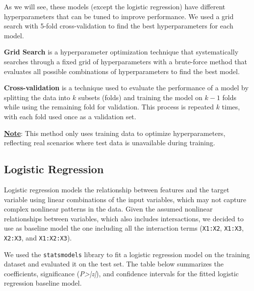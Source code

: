 As we will see, these models (except the logistic regression) have different hyperparameters that can be tuned to improve performance. We used a grid search with 5-fold cross-validation to find the best hyperparameters for each model.

\vspace{-0.2em}

\begin{tcolorbox}[colback=gray!10,colframe=gray!70,title= What are Grid Search and Cross Validation?]
	\textbf{Grid Search} is a hyperparameter optimization technique that systematically searches through a fixed grid of hyperparameters with a brute-force method that evaluates all possible combinations of hyperparameters to find the best model.

	\vspace{0.3em}

	\textbf{Cross-validation} is a technique used to evaluate the performance of a model by splitting the data into $k$ subsets (folds) and training the model on $k-1$ folds while using the remaining fold for validation. This process is repeated $k$ times, with each fold used once as a validation set.
	
	\vspace{0.3em}

	\underline{\textbf{Note}}: This method only uses training data to optimize hyperparameters, reflecting real scenarios where test data is unavailable during training.
\end{tcolorbox}

\subsection{Logistic Regression}

Logistic regression models the relationship between features and the target variable using linear combinations of the input variables, which may not capture complex nonlinear patterns in the data. Given the assumed nonlinear relationships between variables, which also includes intersactions, we decided to use as baseline model the one including all the interaction terms (\texttt{X1:X2}, \texttt{X1:X3}, \texttt{X2:X3}, and \texttt{X1:X2:X3}).

We used the \texttt{statsmodels} library to fit a logistic regression model on the training dataset and evaluated it on the test set. The table below summarizes the coefficients, significance (\textit{P>|z|}), and confidence intervals for the fitted logistic regression baseline model.

